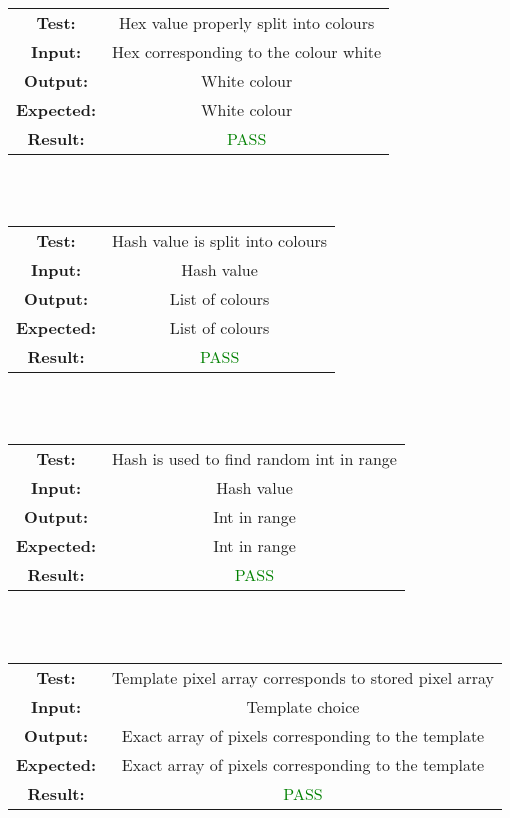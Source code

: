 \documentclass[12pt, titlepage]{article}
\begin{document}
\begin{tabular}{|cc|}
    \hline
    \textbf{Test:} & Hex value properly split into colours \\
    \textbf{Input:} & Hex corresponding to the colour white \\
    \textbf{Output:} & White colour \\
    \textbf{Expected:} & White colour \\
    \textbf{Result:} & \textcolor{Green}{PASS} \\
    \hline
\end{tabular} \\ \\

\begin{tabular}{|cc|}
    \hline
    \textbf{Test:} & Hash value is split into colours \\
    \textbf{Input:} & Hash value \\
    \textbf{Output:} & List of colours \\
    \textbf{Expected:} & List of colours \\
    \textbf{Result:} & \textcolor{Green}{PASS} \\
    \hline
\end{tabular} \\ \\

\begin{tabular}{|cc|}
    \hline
    \textbf{Test:} & Hash is used to find random int in range \\
    \textbf{Input:} & Hash value \\
    \textbf{Output:} & Int in range \\
    \textbf{Expected:} & Int in range \\
    \textbf{Result:} & \textcolor{Green}{PASS} \\
    \hline
\end{tabular} \\ \\

\begin{tabular}{|cc|}
    \hline
    \textbf{Test:} & Template pixel array corresponds to stored pixel array \\
    \textbf{Input:} & Template choice \\
    \textbf{Output:} & Exact array of pixels corresponding to the template \\
    \textbf{Expected:} & Exact array of pixels corresponding to the template \\
    \textbf{Result:} & \textcolor{Green}{PASS} \\
    \hline
\end{tabular} \\ \\
\end{document}
